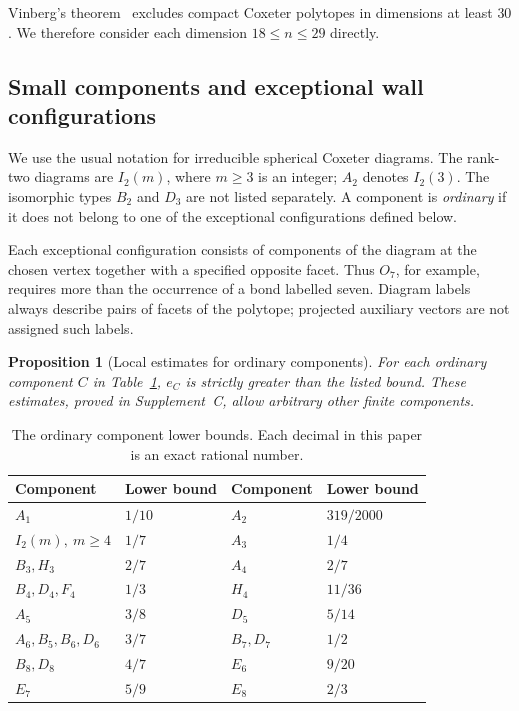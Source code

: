 \documentclass[11pt]{article}
\newtheorem{proposition}[theorem]{Proposition}
\theoremstyle{definition}
\theoremstyle{remark}
\numberwithin{equation}{section}
\begin{document}
Vinberg's theorem~\cite{Vinberg1984} excludes compact Coxeter polytopes
in dimensions at least $30$. We therefore consider each dimension
$18\le n\le29$ directly.

\subsection{Small components and exceptional wall configurations}
\label{c:small}

We use the usual notation for irreducible spherical Coxeter diagrams.
The rank-two diagrams are $I_2(m)$, where $m\ge3$ is an integer;
$A_2$ denotes $I_2(3)$. The isomorphic types $B_2$ and $D_3$ are not
listed separately. A component is \emph{ordinary} if it does not belong
to one of the exceptional configurations defined below.

Each exceptional configuration consists of components of the diagram
at the chosen vertex together with a specified opposite facet. Thus
$O_7$, for example, requires more than the occurrence of a bond labelled
seven. Diagram labels always describe pairs of facets of the polytope;
projected auxiliary vectors are not assigned such labels.

\begin{proposition}[Local estimates for ordinary components]
\label{c:ordinary-input}
For each ordinary component $C$ in Table~\ref{c:ordinary-table},
$e_C$ is strictly greater than the listed bound. These estimates, proved
in Supplement~C, allow arbitrary other finite components.
\end{proposition}

\begin{table}[htbp]
\centering
\caption{The ordinary component lower bounds. Each decimal in this paper
is an exact rational number.}\label{c:ordinary-table}
\begin{tabular}{ll@{\qquad}ll}
\toprule
Component&Lower bound&Component&Lower bound\\\midrule
$A_1$&$1/10$&$A_2$&$319/2000$\\
$I_2(m),\ m\ge4$&$1/7$&$A_3$&$1/4$\\
$B_3,H_3$&$2/7$&$A_4$&$2/7$\\
$B_4,D_4,F_4$&$1/3$&$H_4$&$11/36$\\
$A_5$&$3/8$&$D_5$&$5/14$\\
$A_6,B_5,B_6,D_6$&$3/7$&$B_7,D_7$&$1/2$\\
$B_8,D_8$&$4/7$&$E_6$&$9/20$\\
$E_7$&$5/9$&$E_8$&$2/3$\\\bottomrule
\end{tabular}
\end{table}
\end{document}
